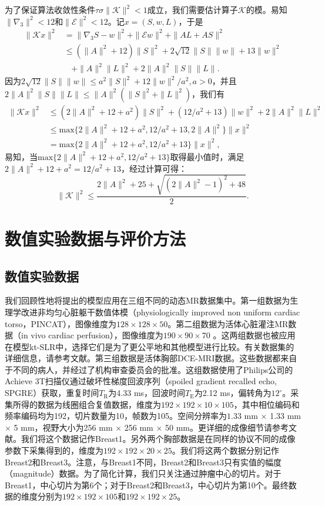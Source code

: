 为了保证算法收敛性条件$\tau\sigma\|\mathcal{K}\|^2<1$成立，我们需要估计算子$\mathcal{K}$的模。易知$\|\nabla_3\|^2<12$和$\|\mathcal{E}\|^2<12$。记$x=(S,w,L)$，于是
\begin{equation*}
	\begin{aligned}
		\|\mathcal{K}x\|^2&=\|\nabla_3 S-w\|^2+\|\mathcal{E} w\|^2+\|AL+AS\|^2 \\
		& \leq (\|A\|^2+12)\|S\|^2+2\sqrt{12}\|S\|\|w\|+13\|w\|^2\\
		& \ \ \ \ +\|A\|^2\|L\|^2+2\|A\|^2\|S\|\|L\|.
	\end{aligned}
\end{equation*}
因为$2\sqrt{12}\|S\|\|w\|\leq a^2\|S\|^2+12\|w\|^2/a^2, a>0$，并且$2\|A\|^2\|S\|\|L\|\leq \|A\|^2(\|S\|^2+\|L\|^2)$，我们有
\begin{equation*}
	\begin{aligned}
		\|\mathcal{K}x\|^2&\leq(2\|A\|^2+12+a^2)\|S\|^2+(12/a^2+13)\|w\|^2+2\|A\|^2\|L\|^2 \\
		&\leq \mathrm{max}\{2\|A\|^2+12+a^2,12/a^2+13,2\|A\|^2\}\|x\|^2 \\
		& = \mathrm{max}\{2\|A\|^2+12+a^2,12/a^2+13\}\|x\|^2,
	\end{aligned}
\end{equation*}
易知，当$\mathrm{max}\{2\|A\|^2+12+a^2,12/a^2+13\}$取得最小值时，满足$2\|A\|^2+12+a^2=12/a^2+13$，经过计算可得：
$$\|\mathcal{K}\|^2\leq \frac{2\|A\|^2+25+\sqrt{(2\|A\|^2-1)^2+48}}{2}.$$ 

\section{数值实验数据与评价方法}
\subsection{数值实验数据}
我们回顾性地将提出的模型应用在三组不同的动态MR数据集中。第一组数据为生理学改进非均匀心脏躯干数值体模（physiologically improved non uniform cardiac torso，PINCAT），图像维度为$128\times 128\times 50$。第二组数据为活体心脏灌注MR数据（in vivo cardiac perfusion），图像维度为$190\times 90\times 70$ 。这两组数据也被应用在模型kt-SLR中，选择它们是为了更公平地和其他模型进行比较。有关数据集的详细信息，请参考文献\cite{segars2002study, sharif2007adaptive}。第三组数据是活体胸部DCE-MRI数据。这些数据都来自于不同的病人，并经过了机构审查委员会的批准。这组数据使用了Philips公司的Achieve 3T扫描仪通过破坏性梯度回波序列（spoiled gradient recalled echo, SPGRE）获取，重复时间$T_\mathrm{R}$为4.33 ms，回波时间$T_\mathrm{E}$为2.12 ms，偏转角为$12^\circ$。采集所得的数据为线圈组合复值数据，维度为$192\times 192\times 10\times 105$，其中相位编码和频率编码均为192，切片数量为10，帧数为105。空间分辨率为$1.33$ mm $\times$ 1.33 mm $\times$ 5 mm，视野大小为256 mm $\times$ 256 mm $\times$ 50 mm。更详细的成像细节请参考文献\cite{li}。我们将这个数据记作Breast1。另外两个胸部数据是在同样的协议不同的成像参数下采集得到的，维度为$192\times 192\times 20\times 25$。我们将这两个数据分别记作Breast2和Breast3。注意，与Breast1不同，Breast2和Breast3只有实值的幅度（magnitude）数据。为了简化计算，我们只关注通过肿瘤中心的切片。对于Breast1，中心切片为第6个；对于Breast2和Breast3，中心切片为第10个。最终数据的维度分别为$192\times 192\times 105$和$192\times 192\times 25$。

